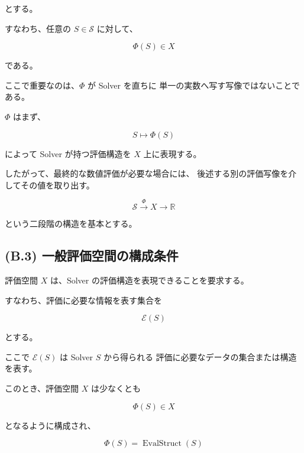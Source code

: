 \documentclass[a4paper,11pt]{article}
\newcommand{\Solver}{\mathcal{S}}
\newcommand{\R}{\mathbb{R}}
\begin{document}
とする。

すなわち、任意の $S\in\Solver$ に対して、

\begin{equation}
    \Phi(S)\in X
\end{equation}

である。

ここで重要なのは、$\Phi$ が Solver を直ちに
単一の実数へ写す写像ではないことである。

$\Phi$ はまず、

\begin{equation}
    S
    \longmapsto
    \Phi(S)
\end{equation}

によって Solver が持つ評価構造を $X$ 上に表現する。

したがって、最終的な数値評価が必要な場合には、
後述する別の評価写像を介してその値を取り出す。

\begin{equation}
    \Solver
    \xrightarrow{\Phi}
    X
    \longrightarrow
    \R
\end{equation}

という二段階の構造を基本とする。


\subsection{(B.3) 一般評価空間の構成条件}
\label{subsec:B3}

評価空間 $X$ は、Solver の評価構造を表現できることを要求する。

すなわち、評価に必要な情報を表す集合を

\begin{equation}
    \mathcal{E}(S)
\end{equation}

とする。

ここで $\mathcal{E}(S)$ は Solver $S$ から得られる
評価に必要なデータの集合または構造を表す。

このとき、評価空間 $X$ は少なくとも

\begin{equation}
    \Phi(S)
    \in X
\end{equation}

となるように構成され、

\begin{equation}
    \Phi(S)
    =
    \operatorname{EvalStruct}(S)
    \label{eq:B-evaluation-structure}
\end{equation}
\end{document}

